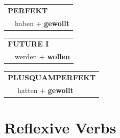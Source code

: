 \documentclass[10pt,a4paper]{revtex4-2}
\begin{document}
\begin{verbbox-modal}
    \vspace{10pt}
 
    \begin{tabular}{rl}
     \multicolumn{2}{l}{\textbf{PERFEKT}}\\
  &  haben + \textbf{gewollt}\\
  \end{tabular}
\hfill
   \begin{tabular}{rl}
   
    \multicolumn{2}{l}{\textbf{FUTURE I} }\\
  &  werden + \textbf{wollen}\\
 
  \end{tabular}
\hfill
   \begin{tabular}{rl}
      \multicolumn{2}{l}{\textbf{PLUSQUAMPERFEKT}}\\
  &  hatten + \textbf{gewollt}\\
  \end{tabular}
  
  \vspace{-5pt}

\end{verbbox-modal}



\section{Reflexive Verbs}
\end{document}
